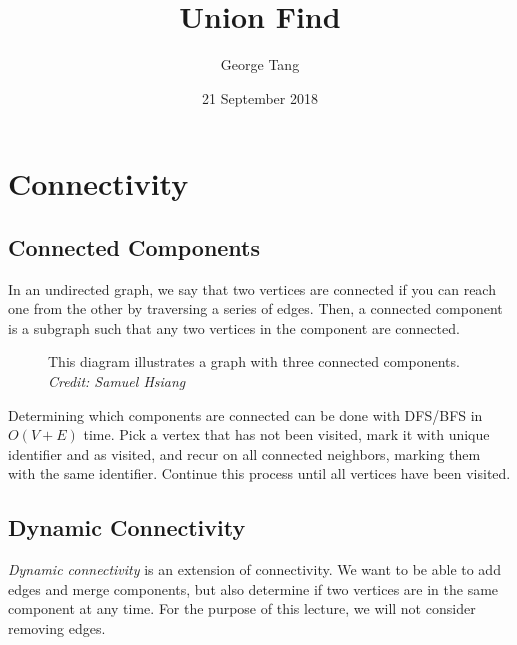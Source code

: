 \documentclass{article}
\title{Union Find}
\author{George Tang}
\date{21 September 2018}
\begin{document}
\maketitle

\section{Connectivity}
\subsection{Connected Components}
In an undirected graph, we say that two vertices are connected if you can reach one from the other by traversing
a series of edges. Then, a connected component is a subgraph such that any two vertices in the component are
connected.

\begin{figure}[h]
\centering
{}
\caption{This diagram illustrates a graph with three connected components. \textit{Credit: Samuel Hsiang}}
\end{figure}

Determining which components are connected can be done with DFS/BFS in $O(V+E)$ time. Pick a vertex that has not been visited, mark it with unique identifier and as visited, and recur on all connected neighbors, marking them with the same identifier. Continue this process until all vertices have been visited.

\subsection{Dynamic Connectivity}
\textit{Dynamic connectivity} is an extension of connectivity. We want to be able to add edges and merge components, but also determine if two vertices are in the same component at any time. For the purpose of this lecture, we will not consider removing edges. 
\end{document}
